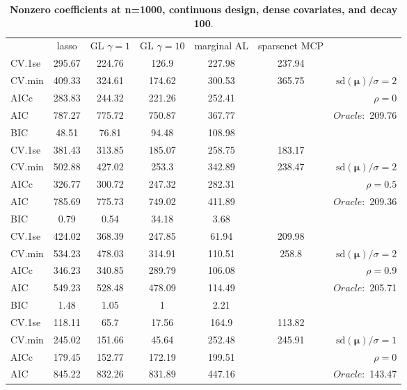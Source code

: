 \clearpage
\begin{table}\vspace{-.5cm}
\caption[l]{ { \bf Nonzero coefficients at n=1000, continuous design, 
dense covariates, and  decay  100}.}
\vspace{-.5cm}
\footnotesize{}
\begin{center}
\begin{tabular}{l*{5}{c}|r}
& lasso & GL $\gamma=1$ & GL $\gamma=10$ & marginal AL & sparsenet MCP  & \\
 \cline{1-7}
CV.1se & 295.67 & 224.76 & 126.9 & 227.98 & 237.94 & \\
CV.min & 409.33 & 324.61 & 174.62 & 300.53 & 365.75 &  $\mathrm{sd}(\mathbf{\mu})/\sigma=2$ \\
AICc & 283.83 & 244.32 & 221.26 & 252.41 & & $\rho=0$ \\
AIC & 787.27 & 775.72 & 750.87 & 367.77 & &  \multirow{2}{*}{$Oracle: $ 209.76} \\
BIC & 48.51 & 76.81 & 94.48 & 108.98 & &  \\
 \hline 
CV.1se & 381.43 & 313.85 & 185.07 & 258.75 & 183.17 & \\
CV.min & 502.88 & 427.02 & 253.3 & 342.89 & 238.47 &  $\mathrm{sd}(\mathbf{\mu})/\sigma=2$ \\
AICc & 326.77 & 300.72 & 247.32 & 282.31 & & $\rho=0.5$ \\
AIC & 785.69 & 775.73 & 749.02 & 411.89 & &  \multirow{2}{*}{$Oracle: $ 209.36} \\
BIC & 0.79 & 0.54 & 34.18 & 3.68 & &  \\
 \hline 
CV.1se & 424.02 & 368.39 & 247.85 & 61.94 & 209.98 & \\
CV.min & 534.23 & 478.03 & 314.91 & 110.51 & 258.8 &  $\mathrm{sd}(\mathbf{\mu})/\sigma=2$ \\
AICc & 346.23 & 340.85 & 289.79 & 106.08 & & $\rho=0.9$ \\
AIC & 549.23 & 528.48 & 478.09 & 114.49 & &  \multirow{2}{*}{$Oracle: $ 205.71} \\
BIC & 1.48 & 1.05 & 1 & 2.21 & &  \\
 \hline 
CV.1se & 118.11 & 65.7 & 17.56 & 164.9 & 113.82 & \\
CV.min & 245.02 & 151.66 & 45.64 & 252.48 & 245.91 &  $\mathrm{sd}(\mathbf{\mu})/\sigma=1$ \\
AICc & 179.45 & 152.77 & 172.19 & 199.51 & & $\rho=0$ \\
AIC & 845.22 & 832.26 & 831.89 & 447.16 & &  \multirow{2}{*}{$Oracle: $ 143.47} \\

\end{tabular}
\end{center}
\end{table}
